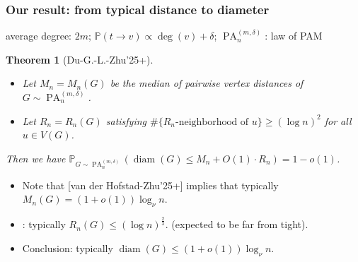 \documentclass{beamer}
\theoremstyle{plain}
\newtheorem{thm}{Theorem}
\theoremstyle{definition}
\begin{document}
\begin{frame}
\frametitle{Our result: from typical distance to diameter}
average degree: $2m$; \quad $\mathbb P(t\to v)\varpropto \operatorname{deg}(v)+\delta$; \quad $\operatorname{PA}^{(m,\delta)}_n$: law of PAM
\begin{thm}[Du-G.-L.-Zhu'25+]
    \begin{itemize}
        \item Let $M_n=M_n(G)$ be the median of pairwise vertex distances of $G \sim \operatorname{PA}^{(m,\delta)}_n$.
        \item Let $R_n = R_n(G)$ satisfying $\#\{ R_n \mbox{-neighborhood of } u \} \geq (\log n)^2$ for all $u \in V(G)$. 
    \end{itemize} 
    Then we have $\mathbb P_{G \sim \operatorname{PA}^{(m,\delta)}_n}(\operatorname{diam}(G) \leq M_n+O(1)\cdot R_n)=1-o(1)$.
\end{thm}
\begin{itemize}
    \item \pause Note that {\color{rgr}[van der Hofstad-Zhu'25+]} implies that typically $M_n(G)=(1+o(1))\log_\nu n$.
    \item \pause {\color{rgr}[Du-G.-L.-Zhu'25+]}: typically $R_n(G)\leq (\log n)^{\frac{2}{3}}$. {\color{bgr}(expected to be far from tight)}.
    \item \pause Conclusion: typically $\operatorname{diam}(G) \leq  (1+o(1))\log_\nu n$.
\end{itemize}
\end{frame}
\end{document}
